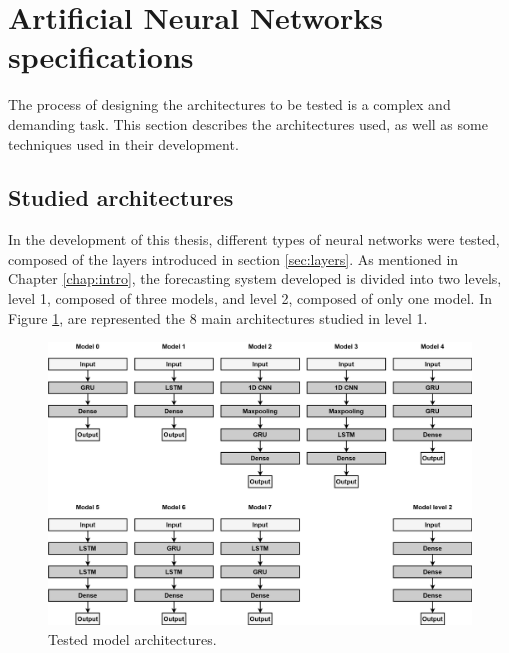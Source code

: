 \section{Artificial Neural Networks specifications} \label{chap4:anns}

The process of designing the architectures to be tested is a complex and demanding task. This section describes the architectures used, as well as some techniques used in their development.

\subsection{Studied architectures}\label{sec:arq}
In the development of this thesis, different types of neural networks were tested, composed of the layers introduced in section \ref{sec:layers}. As mentioned in Chapter \ref{chap:intro}, the forecasting system developed is divided into two levels, level 1, composed of three models, and level 2, composed of only one model. In Figure \ref{models}, are represented the 8 main architectures studied in level 1.

\begin{figure}[h!]
    \centering
    \begin{center}
    \includegraphics[width=1\textwidth]{Images/models.png}
    \caption{Tested model architectures.}
    \label{models}
    \end{center}
\end{figure}

